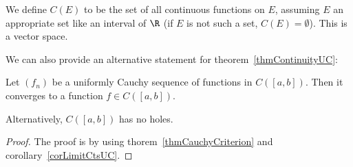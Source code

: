 \documentclass[../Main.tex]{subfiles}
\begin{document}
\begin{remark}
    We define $C(E)$ to be the set of all continuous functions on $E$, assuming $E$ an appropriate set like an interval of $\R$ (if $E$ is not such a set, $C(E) = \emptyset$). This is a vector space.
\end{remark}
We can also provide an alternative statement for theorem~\ref{thmContinuityUC}:
\begin{corollary}
    Let $(f_n)$ be a uniformly Cauchy sequence of functions in $C([a, b])$. Then it converges to a function $f \in C([a, b])$.
    \label{corUCauchyCts}
\end{corollary}
Alternatively, $C([a, b])$ has no holes.
\begin{proof}
    The proof is by using thorem~\ref{thmCauchyCriterion} and corollary~\ref{corLimitCtsUC}.
\end{proof}
\end{document}
